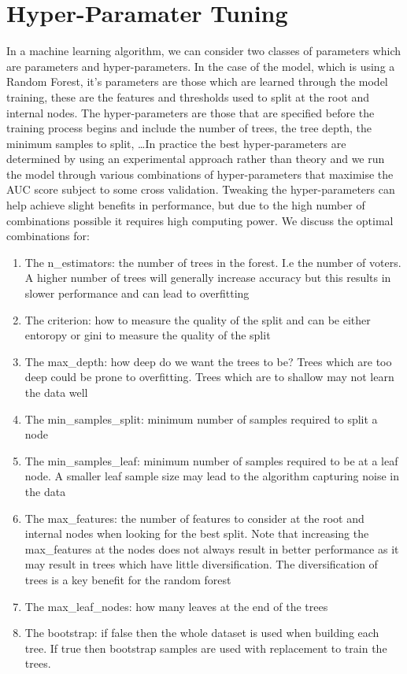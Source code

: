 \documentclass[11pt, oneside]{article}   	%
\begin{document}
\section{Hyper-Paramater Tuning}
In a machine learning algorithm, we can consider two classes of parameters which are parameters and hyper-parameters. In the case of the  model, which is using a Random Forest, it’s parameters are those which are learned through the model training, these are the features and thresholds used to split at the root and internal nodes. The hyper-parameters are those that are specified before the training process begins and include the number of trees, the tree depth, the minimum samples to split, \ldots In practice the best hyper-parameters are determined by using an experimental approach rather than theory and we run the model through various combinations of hyper-parameters that maximise the AUC score subject to some cross validation. Tweaking the hyper-parameters can help achieve slight benefits in performance, but due to the high number of combinations possible it requires high computing power. We discuss the optimal combinations for:

\begin{enumerate}

\item The n\_estimators: the number of trees in the forest. I.e the number of voters. A higher number of trees will generally increase accuracy but this results in slower performance and can lead to overfitting
\item  The criterion: how to measure the quality of the split and can be either entoropy or gini to measure the quality of the split
\item The max\_depth: how deep do we want the trees to be? Trees which are too deep could be prone to overfitting. Trees which are to shallow may not learn the data well
\item The min\_samples\_split: minimum number of samples required to split a node
\item The min\_samples\_leaf: minimum number of samples required to be at a leaf node. A smaller leaf sample size may lead to the algorithm capturing noise in the data
\item The max\_features: the number of features to consider at the root and internal nodes when looking for the best split. Note that increasing the max\_features at the nodes does not always result in better performance as it may result in trees which have little diversification. The diversification of trees is a key benefit for the random forest
\item The max\_leaf\_nodes: how many leaves at the end of the trees
\item The bootstrap: if false then the whole dataset is used when building each tree. If true then bootstrap samples are used with replacement to train the trees.
\end{enumerate}
\end{document}

